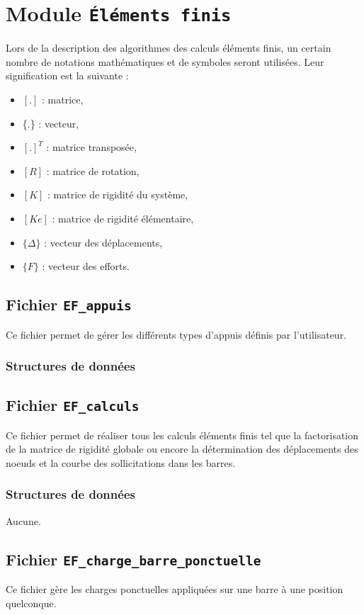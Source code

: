 \documentclass{article}
\begin{document}
\section{Module {\texttt{Éléments finis}}}
Lors de la description des algorithmes des calculs éléments finis, un certain nombre de notations mathématiques et de symboles seront utilisées. Leur signification est la suivante :
\begin{itemize}
\item $[.]$ : matrice,
\item \{.\} : vecteur,
\item $[.]^T$ : matrice transposée,
\item $[R]$ : matrice de rotation,
\item $[K]$ : matrice de rigidité du système,
\item $[Ke]$ : matrice de rigidité élémentaire,
\item $\{\Delta\}$ : vecteur des déplacements,
\item $\{F\}$ : vecteur des efforts.
\end{itemize}
\subsection{Fichier {\texttt{EF\_appuis}}}
Ce fichier permet de gérer les différents types d'appuis définis par l'utilisateur.\par
\subsubsection{Structures de données}


\subsection{Fichier {\texttt{EF\_calculs}}}
Ce fichier permet de réaliser tous les calculs éléments finis tel que la factorisation de la matrice de rigidité globale ou encore la détermination des déplacements des noeuds et la courbe des sollicitations dans les barres.
\subsubsection{Structures de données}
Aucune.

\subsection{Fichier {\texttt{EF\_charge\_barre\_ponctuelle}}}
Ce fichier gère les charges ponctuelles appliquées sur une barre à une position quelconque.
\end{document}
